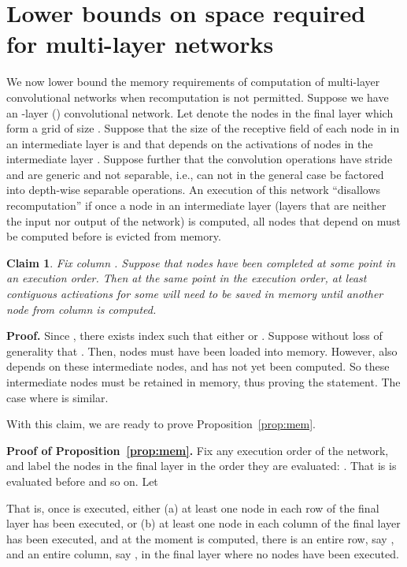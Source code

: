 \documentclass[10pt]{article}
\newtheorem{claim}{Claim}
\begin{document}
 
\section{Lower bounds on space required for multi-layer networks}
\label{sec:space}

We now lower bound the memory requirements of computation of
multi-layer convolutional networks when recomputation is not
permitted.  Suppose we have an -layer () convolutional network.
Let  denote the nodes in the final layer which form a grid of size
.  Suppose that the size of the receptive field of each node in
 in an intermediate layer  is  and that
 depends on the activations of nodes  in the
intermediate layer .  Suppose further that the convolution
operations have stride  and are generic and not separable, i.e.,
can not in the general case be factored into depth-wise separable
operations.  An execution of this network ``disallows recomputation''
if once a node  in an intermediate layer (layers that are neither
the input nor output of the network) is computed, all nodes 
that depend on  must be computed before  is evicted from memory.

\begin{claim}
\label{cl:mem}
Fix column . Suppose that nodes  have been completed at some point in an execution order. Then at
the same point in the execution order, at least  contiguous
activations  for some  will need to be saved in
memory until another node from column  is computed.
\end{claim}

\textbf{Proof.}
Since , there exists index 
such that either  or . Suppose without
loss of generality that . Then, nodes
 must have been loaded into memory. However,
 also depends on these intermediate nodes, and has not
yet been computed. So these  intermediate nodes must be retained
in memory, thus proving the statement. The case where 
is similar.

With this claim, we are ready to prove Proposition~\ref{prop:mem}.

\textbf{Proof of Proposition~\ref{prop:mem}.}
Fix any execution order of the network, and label the nodes in the
final layer  in the order they are evaluated: . That is  is evaluated
before  and so on. Let

That is, once  is executed, either (a) at
least one node in each row of the final layer has been executed, or
(b) at least one node in each column of the final layer has been
executed, and at the moment  is
computed, there is an entire row, say , and an entire column, say
, in the final layer where no nodes have been executed.
\end{document}
